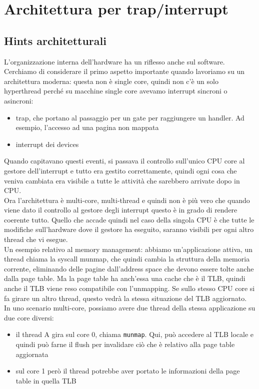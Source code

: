 \documentclass[12pt, oneside]{extbook}
\begin{document}
\chapter{Architettura per trap/interrupt}
\section{Hints architetturali}
L'organizzazione interna dell'hardware ha un riflesso anche sul software. Cerchiamo di considerare il primo aspetto importante quando lavoriamo su un architettura moderna: questa non è single core, quindi non c'è un solo hyperthread perché su macchine single core avevamo interrupt sincroni o asincroni:
\begin{itemize}
\item trap, che portano al passaggio per un gate per raggiungere un handler. Ad esempio, l'accesso ad una pagina non mappata
\item interrupt dei devices
\end{itemize}
Quando capitavano questi eventi, si passava il controllo sull'unico CPU core al gestore dell'interrupt e tutto era gestito correttamente, quindi ogni cosa che veniva cambiata era visibile a tutte le attività che sarebbero arrivate dopo in CPU.\\Ora l'architettura è multi-core, multi-thread e quindi non è più vero che quando viene dato il controllo al gestore degli interrupt questo è in grado di rendere coerente tutto. Quello che accade quindi nel caso della singola CPU è che tutte le modifiche sull'hardware dove il gestore ha eseguito, saranno visibili per ogni altro thread che vi esegue.\\Un esempio relativo al memory management: abbiamo un'applicazione attiva, un thread chiama la syscall munmap, che quindi cambia la struttura della memoria corrente, eliminando delle pagine dall'address space che devono essere tolte anche dalla page table. Ma la page table ha anch'essa una cache che è il TLB, quindi anche il TLB viene reso compatibile con l'unmapping. Se sullo stesso CPU core si fa girare un altro thread, questo vedrà la stessa situazione del TLB aggiornato.\\In uno scenario multi-core, possiamo avere due thread della stessa applicazione su due core diversi:
\begin{itemize}
\item il thread A gira sul core 0, chiama \texttt{munmap}. Qui, può accedere al TLB locale e quindi può farne il flush per invalidare ciò che è relativo alla page table aggiornata
\item sul core 1 però il thread potrebbe aver portato le informazioni della page table in quella TLB
\end{itemize}
\end{document}
